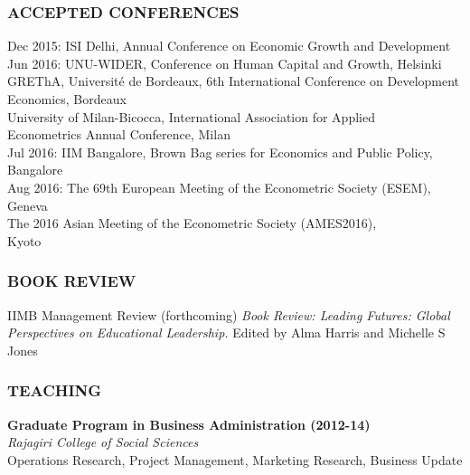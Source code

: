 \documentclass[12pt, a4paper]{article}
\begin{document}
	\subsubsection*{ACCEPTED CONFERENCES} 
Dec 2015: \tabto{5em} ISI Delhi, Annual Conference on Economic Growth and Development \\
Jun 2016: \tabto{5em} UNU-WIDER, Conference on Human Capital and Growth, Helsinki \\
\tabto{5em} GREThA, Universit\'{e} de Bordeaux, 6th International Conference on \tabto{5em} Development Economics, Bordeaux \\	
\tabto{5em} University of Milan-Bicocca, International Association for Applied \\ \tabto{5em} Econometrics Annual Conference, Milan \\
Jul 2016: \tabto{5em} IIM Bangalore, Brown Bag series for Economics and Public Policy, \\
\tabto{5em} Bangalore \\
Aug 2016: \tabto{5em} The 69th European Meeting of the Econometric Society (ESEM), Geneva \\
\tabto{5em} The 2016 Asian Meeting of the Econometric Society (AMES2016),\\ 
\tabto{5em} Kyoto

	\subsubsection*{BOOK REVIEW}
	
	IIMB Management Review (forthcoming) \textit{Book Review: Leading Futures: Global Perspectives on Educational Leadership.} Edited by Alma Harris and Michelle S Jones
	
	\subsubsection*{TEACHING}
	\noindent\textbf{Graduate Program in Business Administration (2012-14)} \\
	\noindent\textit{Rajagiri College of Social Sciences} \\
	Operations Research, Project Management, Marketing Research, Business Update 
\end{document}
